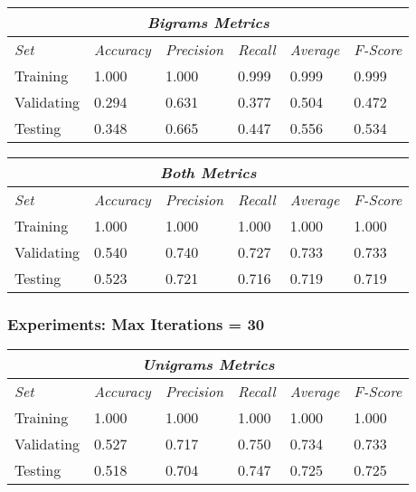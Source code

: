 \documentclass[11pt]{article}
\begin{document}
\hfill \break

\begin{tabular}{ |p{2cm}||p{2cm}|p{2cm}|p{2cm}|p{2cm}|p{2cm}|  }
 \hline
 \multicolumn{6}{|c|}{\textbf{\textit{Bigrams Metrics}}} \\
 \hline
 \textit{Set} & \textit{Accuracy} & \textit{Precision} & \textit{Recall} & \textit{Average} & \textit{F-Score} \\
 \hline
 Training   & 1.000 & 1.000 & 0.999 & 0.999 & 0.999 \\
 Validating & 0.294 & 0.631 & 0.377 & 0.504 & 0.472 \\
 Testing    & 0.348 & 0.665 & 0.447 & 0.556 & 0.534 \\
 \hline
\end{tabular}

\hfill \break

\begin{tabular}{ |p{2cm}||p{2cm}|p{2cm}|p{2cm}|p{2cm}|p{2cm}|  }
 \hline
 \multicolumn{6}{|c|}{\textbf{\textit{Both Metrics}}} \\
 \hline
 \textit{Set} & \textit{Accuracy} & \textit{Precision} & \textit{Recall} & \textit{Average} & \textit{F-Score} \\
 \hline
 Training   & 1.000 & 1.000 & 1.000 & 1.000 & 1.000 \\
 Validating & 0.540 & 0.740 & 0.727 & 0.733 & 0.733 \\
 Testing    & 0.523 & 0.721 & 0.716 & 0.719 & 0.719 \\
 \hline
\end{tabular}


\subsubsection{Experiments: Max Iterations = 30}

\begin{tabular}{ |p{2cm}||p{2cm}|p{2cm}|p{2cm}|p{2cm}|p{2cm}|  }
 \hline
 \multicolumn{6}{|c|}{\textbf{\textit{Unigrams Metrics}}} \\
 \hline
 \textit{Set} & \textit{Accuracy} & \textit{Precision} & \textit{Recall} & \textit{Average} & \textit{F-Score} \\
 \hline
 Training   & 1.000 & 1.000 & 1.000 & 1.000 & 1.000 \\
 Validating & 0.527 & 0.717 & 0.750 & 0.734 & 0.733 \\
 Testing    & 0.518 & 0.704 & 0.747 & 0.725 & 0.725 \\
 \hline
\end{tabular}
\end{document}
